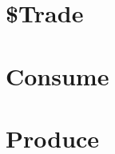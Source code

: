 \documentclass[letterpaper,landscape,twocolumn,8pt]{extarticle}
\begin{document}

\section*{\$\enspace{}Trade}%
\section{Consume}%
\section{Produce}%
\end{document}
